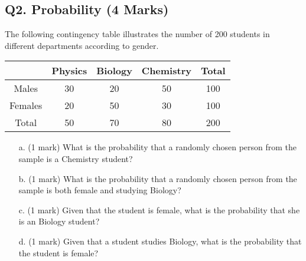 \documentclass[]{report}
\begin{document}
\subsection*{Q2. Probability (4 Marks)} %

The following contingency table illustrates the number of 200 students in different
departments according to gender.

\begin{center}
	\begin{tabular}{|c|c|c|c|c|}
		\hline
		& Physics & Biology & Chemistry & Total \\\hline
		Males & 30 & 20 & 50 & 100 \\  \hline
		Females & 20 & 50 & 30 & 100 \\ \hline
		Total & 50 & 70 & 80 & 200 \\
		\hline
	\end{tabular}
\end{center}

\begin{itemize}
	\item[a.] (1 mark) What is the probability that a randomly chosen person from the sample is a
	Chemistry student?
	\item[b.] (1 mark) What is the probability that a randomly chosen person from the sample is both female and studying Biology?
	\item[c.] (1 mark) Given that the student is female, what is the probability that she is an
	Biology student?
	\item[d.] (1 mark) Given that a student studies Biology, what is the probability that the student is female?
\end{itemize}

\bigskip
\end{document}
